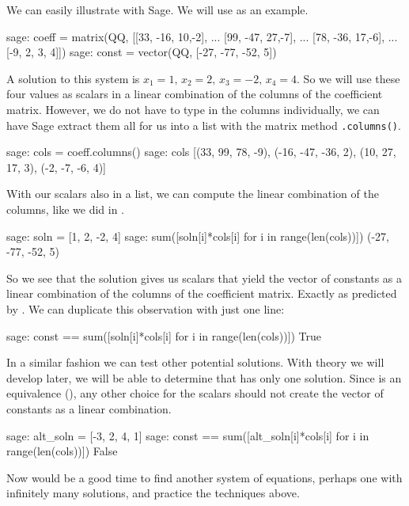 We can easily illustrate  with Sage.  We will use  as an example.
%
\begin{sageexample}
sage: coeff = matrix(QQ, [[33, -16,  10,-2],
...                       [99, -47,  27,-7],
...                       [78, -36,  17,-6],
...                       [-9,   2,   3, 4]])
sage: const = vector(QQ, [-27, -77, -52, 5])
\end{sageexample}
%
A solution to this system is $x_1=1,\,x_2=2,\,x_3=-2,\,x_4=4$.  So we will use these four values as scalars in a linear combination of the columns of the coefficient matrix.  However, we do not have to type in the columns individually, we can have Sage extract them all for us into a list with the matrix method \verb?.columns()?.
%
\begin{sageexample}
sage: cols = coeff.columns()
sage: cols
[(33, 99, 78, -9), (-16, -47, -36, 2),
 (10, 27, 17, 3), (-2, -7, -6, 4)]
\end{sageexample}
%
With our scalars also in a list, we can compute the linear combination of the columns, like we did in .
%
\begin{sageexample}
sage: soln = [1, 2, -2, 4]
sage: sum([soln[i]*cols[i] for i in range(len(cols))])
(-27, -77, -52, 5)
\end{sageexample}
%
So we see that the solution gives us scalars that yield the vector of constants as a linear combination of the columns of the coefficient matrix.  Exactly as predicted by .  We can duplicate this observation with just one line:
%
\begin{sageexample}
sage: const == sum([soln[i]*cols[i] for i in range(len(cols))])
True
\end{sageexample}
%
In a similar fashion we can test other potential solutions.  With theory we will develop later, we will be able to determine that  has only one solution.  Since  is an equivalence (), any other choice for the scalars should not create the vector of constants as a linear combination.
%
\begin{sageexample}
sage: alt_soln = [-3, 2, 4, 1]
sage: const == sum([alt_soln[i]*cols[i] for i in range(len(cols))])
False
\end{sageexample}
%
Now would be a good time to find another system of equations, perhaps one with infinitely many solutions, and practice the techniques above.
%
\begin{sageverbatim}
\end{sageverbatim}
%
